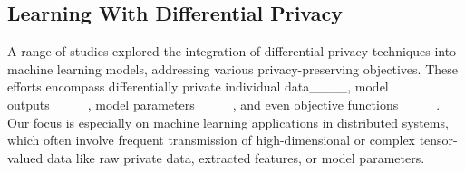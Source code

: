 

\subsection{Learning With Differential Privacy}
A range of studies explored the integration of differential privacy techniques into machine learning models, addressing various privacy-preserving objectives. These efforts encompass differentially private individual data____, model outputs____, model parameters____, and even objective functions____. Our focus is especially on machine learning applications in distributed systems, which often involve frequent transmission of high-dimensional or complex tensor-valued data like raw private data, extracted features, or model parameters. 

